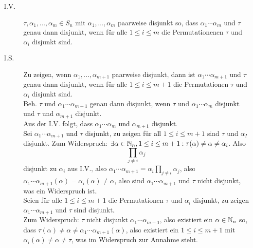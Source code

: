 \documentclass[sectionformat = aufgabe]{gadsescript}
\begin{document}
\begin{enumerate}[label=(\alph*)]
\begin{description}
			\item[I.V.] $ \tau, \alpha_1, \dotsc, \alpha_m \in S_n $ mit $ \alpha_1, \dotsc, \alpha_m $ paarweise disjunkt so, dass $ \alpha_1 \dotsb \alpha_m $ und $ \tau $ genau dann disjunkt, wenn für alle $ 1 \leq i \leq m $ die Permutationenen $ \tau $ und $ \alpha_i $ disjunkt sind.
			\item[I.S.] Zu zeigen, wenn $ \alpha_1, \dotsc, \alpha_{m + 1}  $ paarweise disjunkt, dann ist $ \alpha_1 \dotsb \alpha_{m + 1}  $ und $ \tau $ genau dann disjunkt, wenn für alle $ 1 \leq i \leq m + 1 $ die Permutationen $ \tau $ und $ \alpha_i $ disjunkt sind.\\
				Beh. $ \tau $ und $ \alpha_1 \dotsb \alpha_{m + 1}  $ genau dann disjunkt, wenn $ \tau $ und $ \alpha_1 \dotsb \alpha_m $ disjunkt und $ \tau $ und $ \alpha_{m + 1}  $ disjunkt.\\
				Aus der I.V. folgt, dass $ \alpha_1 \dotsb \alpha_m $ und $ \alpha_{m + 1}  $ disjunkt.\\
				Sei $ \alpha_1 \dotsb \alpha_{m + 1}  $ und $ \tau $ disjunkt, zu zeigen für all $ 1 \leq i \leq m + 1 $ sind $ \tau $ und $ \alpha_I $ disjunkt.
				Zum Widerspruch: $ \exists \alpha \in \mathbb{N} _n, 1 \leq i \leq m + 1 : \tau(\alpha) \neq \alpha \neq \alpha_i $. Also
				\[
					\prod_{j \neq i} \alpha_j
				\]
				disjunkt zu $ \alpha_i $ aus I.V., also $ \alpha_1 \dotsb \alpha_{m + 1} = \alpha_i \prod_{j \neq i} \alpha_j $,
				also $ \alpha_1 \dotsb \alpha_{m + 1} (\alpha) = \alpha_i(\alpha) \neq \alpha $, also sind $ \alpha_1 \dotsb \alpha_{m + 1}  $ und $ \tau $ nicht disjunkt, was ein Widerspruch ist.\\
				Seien für alle $ 1 \leq i \leq m + 1 $ die Permutationen $ \tau $ und $ \alpha_i $ disjunkt, zu zeigen $ \alpha_1 \dotsb \alpha_{m + 1}  $ und $ \tau $ sind disjunkt.\\
				Zum Widerspruch: $ \tau $ nicht disjunkt $ \alpha_1 \dotsb \alpha_{m + 1}  $, also existiert ein $ \alpha \in \mathbb{N} _n $ so, dass $ \tau(\alpha) \neq \alpha \neq \alpha_1 \dotsb \alpha_{m + 1} (\alpha) $,
				also existiert ein $ 1 \leq  i \leq m + 1 $ mit $ \alpha_i(\alpha) \neq \alpha \neq \tau $, was im Widerspruch zur Annahme steht.
		\end{description}

\end{enumerate}
\end{document}
